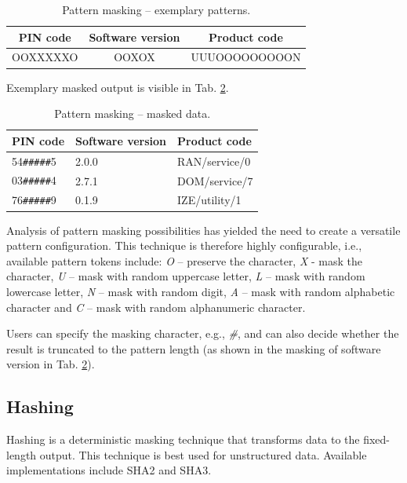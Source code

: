 \documentclass[a4paper,twoside,12pt]{book}
\begin{document}
\begin{table}%
\centering
\caption{Pattern masking – exemplary patterns.}
\label{id:tab:pattern_masking_patterns}
\begin{tabular}{ccc}
\toprule
PIN code & Software version & Product code  \\ \midrule
OOXXXXXO & OOXOX            & UUUOOOOOOOOON \\ \bottomrule
\end{tabular}
\end{table}

Exemplary masked output is visible in Tab. \ref{id:tab:pattern_masking_masked}.

\begin{table}%
\centering
\caption{Pattern masking – masked data.}
\label{id:tab:pattern_masking_masked}
\begin{tabular}{lll}
\toprule
PIN code & Software version & Product code  \\ \midrule
54\verb|#####|5 & 2.0.0 & RAN/service/0 \\
03\verb|#####|4 & 2.7.1 & DOM/service/7 \\
76\verb|#####|9 & 0.1.9 & IZE/utility/1 \\ \bottomrule
\end{tabular}
\end{table}

Analysis of pattern masking possibilities has yielded the need to create a versatile pattern configuration. This technique is therefore highly configurable, i.e., available pattern tokens include: \textit{O} – preserve the character, \textit{X} - mask the character, \textit{U} – mask with random uppercase letter, \textit{L} – mask with random lowercase letter, \textit{N} – mask with random digit, \textit{A} – mask with random alphabetic character and \textit{C} – mask with random alphanumeric character.

Users can specify the masking character, e.g., \textit{\#}, and can also decide whether the result is truncated to the pattern length (as shown in the masking of software version in Tab. \ref{id:tab:pattern_masking_masked}).

\subsection{Hashing}

Hashing is a deterministic masking technique \cite{bib:anonymization_for_research} that transforms data to the fixed-length output. This technique is best used for unstructured data. Available implementations include SHA2 and SHA3.
\end{document}
